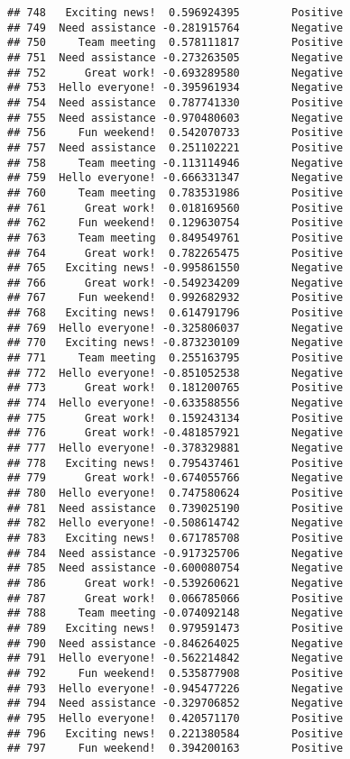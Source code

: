\documentclass[
]{article}
\begin{document}
\begin{verbatim}
## 748   Exciting news!  0.596924395        Positive
## 749  Need assistance -0.281915764        Negative
## 750     Team meeting  0.578111817        Positive
## 751  Need assistance -0.273263505        Negative
## 752      Great work! -0.693289580        Negative
## 753  Hello everyone! -0.395961934        Negative
## 754  Need assistance  0.787741330        Positive
## 755  Need assistance -0.970480603        Negative
## 756     Fun weekend!  0.542070733        Positive
## 757  Need assistance  0.251102221        Positive
## 758     Team meeting -0.113114946        Negative
## 759  Hello everyone! -0.666331347        Negative
## 760     Team meeting  0.783531986        Positive
## 761      Great work!  0.018169560        Positive
## 762     Fun weekend!  0.129630754        Positive
## 763     Team meeting  0.849549761        Positive
## 764      Great work!  0.782265475        Positive
## 765   Exciting news! -0.995861550        Negative
## 766      Great work! -0.549234209        Negative
## 767     Fun weekend!  0.992682932        Positive
## 768   Exciting news!  0.614791796        Positive
## 769  Hello everyone! -0.325806037        Negative
## 770   Exciting news! -0.873230109        Negative
## 771     Team meeting  0.255163795        Positive
## 772  Hello everyone! -0.851052538        Negative
## 773      Great work!  0.181200765        Positive
## 774  Hello everyone! -0.633588556        Negative
## 775      Great work!  0.159243134        Positive
## 776      Great work! -0.481857921        Negative
## 777  Hello everyone! -0.378329881        Negative
## 778   Exciting news!  0.795437461        Positive
## 779      Great work! -0.674055766        Negative
## 780  Hello everyone!  0.747580624        Positive
## 781  Need assistance  0.739025190        Positive
## 782  Hello everyone! -0.508614742        Negative
## 783   Exciting news!  0.671785708        Positive
## 784  Need assistance -0.917325706        Negative
## 785  Need assistance -0.600080754        Negative
## 786      Great work! -0.539260621        Negative
## 787      Great work!  0.066785066        Positive
## 788     Team meeting -0.074092148        Negative
## 789   Exciting news!  0.979591473        Positive
## 790  Need assistance -0.846264025        Negative
## 791  Hello everyone! -0.562214842        Negative
## 792     Fun weekend!  0.535877908        Positive
## 793  Hello everyone! -0.945477226        Negative
## 794  Need assistance -0.329706852        Negative
## 795  Hello everyone!  0.420571170        Positive
## 796   Exciting news!  0.221380584        Positive
## 797     Fun weekend!  0.394200163        Positive

\end{verbatim}
\end{document}
